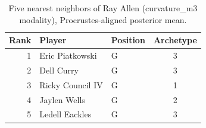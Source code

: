 \begin{table}[htbp]
  \centering\small
  \begin{tabular}{rllc}
    \toprule
    Rank & Player & Position & Archetype \\
    \midrule
    1 & Eric Piatkowski & G & 3 \\
    2 & Dell Curry & G & 3 \\
    3 & Ricky Council IV & G & 1 \\
    4 & Jaylen Wells & G & 2 \\
    5 & Ledell Eackles & G & 3 \\
    \bottomrule
  \end{tabular}
  \caption{Five nearest neighbors of Ray Allen (curvature_m3 modality), Procrustes-aligned posterior mean.}
  \label{tab:Ray_Allen_neighbors_curvature_m3}
\end{table}

